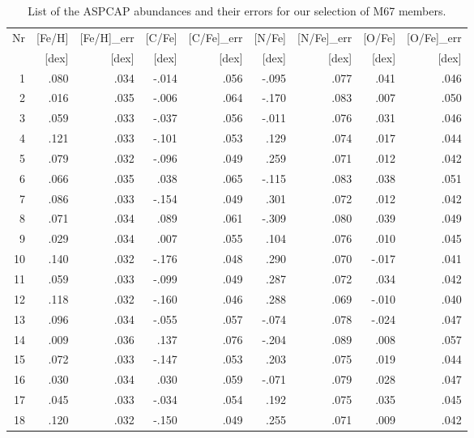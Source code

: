 \documentclass[a4paper,fleqn,usenatbib]{mnras}
\begin{document}
	\begin{landscape}
		\begin{table}
			\centering
			\caption{List of the ASPCAP abundances and their errors for our selection of M67 members.}
\begin{tabular}{|r|r|r|r|r|r|r|r|r|}
	\hline
	\multicolumn{1}{|r|}{Nr} &
	\multicolumn{1}{r|}{[Fe/H]} &
	\multicolumn{1}{r|}{[Fe/H]\_err} &
	\multicolumn{1}{r|}{[C/Fe]} &
	\multicolumn{1}{r|}{[C/Fe]\_err} &
	\multicolumn{1}{r|}{[N/Fe]} &
	\multicolumn{1}{r|}{[N/Fe]\_err} &
	\multicolumn{1}{r|}{[O/Fe]} &
	\multicolumn{1}{r|}{[O/Fe]\_err} \\
	{}&{[dex]}&{[dex]}&{[dex]}&{[dex]}&{[dex]}&{[dex]}&{[dex]}&{[dex]}\\
\hline
 1 & .080 & .034 & -.014 & .056 & -.095 & .077 & .041 & .046\\
 2 & .016 & .035 & -.006 & .064 & -.170 & .083 & .007 & .050\\
 3 & .059 & .033 & -.037 & .056 & -.011 & .076 & .031 & .046\\
 4 &  .121 & .033 & -.101 & .053 & .129 & .074 & .017 & .044\\
 5 & .079 & .032 & -.096 & .049 & .259 & .071 & .012 & .042\\
 6 & .066 & .035 & .038 & .065 & -.115 & .083 & .038 & .051\\
 7 & .086 & .033 & -.154 & .049 & .301 & .072 & .012 & .042\\
 8 & .071 & .034 & .089 & .061 & -.309 & .080 & .039 & .049\\
 9 & .029 & .034 & .007 & .055 & .104 & .076 & .010 & .045\\
 10 & .140 & .032 & -.176 & .048 & .290 & .070 & -.017 & .041\\
 11 & .059 & .033 & -.099 & .049 & .287 & .072 & .034 & .042\\
 12 & .118 & .032 & -.160 & .046 & .288 & .069 & -.010 & .040\\
 13 & .096 & .034 & -.055 & .057 & -.074 & .078 & -.024 & .047\\
 14 & .009 & .036 & .137 & .076 & -.204 & .089 & .008 & .057\\
 15 & .072 & .033 & -.147 & .053 & .203 & .075 & .019 & .044\\
 16 & .030 & .034 & .030 & .059 & -.071 & .079 & .028 & .047\\
 17 & .045 & .033 & -.034 & .054 & .192 & .075 & .035 & .045\\
 18 & .120 & .032 & -.150 & .049 & .255 & .071 & .009 & .042\\

\end{tabular}
\end{table}
\end{landscape}
\end{document}
